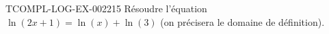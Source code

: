 \begin{exercice}{TCOMPL-LOG-EX-002}{2}{15}
Résoudre l'équation $\ln(2x+1) = \ln(x) + \ln(3)$ (on précisera le domaine de définition).
\end{exercice}
